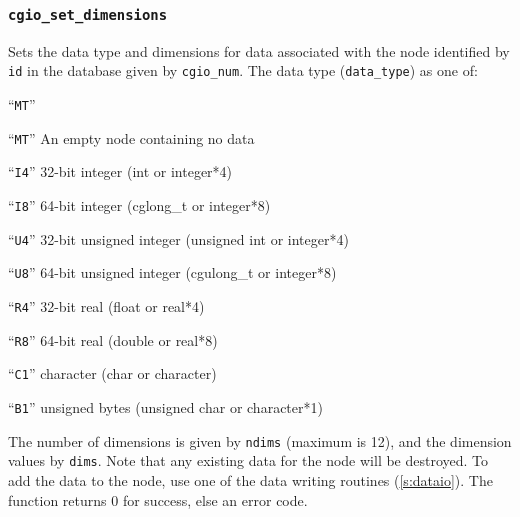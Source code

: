 \subsubsection{\texttt{cgio\_set\_dimensions}} \label{set_dimensions}
    \noindent
    Sets the data type and dimensions for data associated with the node
    identified by \texttt{id} in the database given by \texttt{cgio\_num}.
    The data type (\texttt{data\_type}) as one of:
    \begin{Ventryi}{``\texttt{MT}''}
    \item [``\texttt{MT}'']
          An empty node containing no data
    \item [``\texttt{I4}'']
          32-bit integer (int or integer*4)
    \item [``\texttt{I8}'']
          64-bit integer (cglong\_t or integer*8)
    \item [``\texttt{U4}'']
          32-bit unsigned integer (unsigned int or integer*4)
    \item [``\texttt{U8}'']
          64-bit unsigned integer (cgulong\_t or integer*8)
    \item [``\texttt{R4}'']
          32-bit real (float or real*4)
    \item [``\texttt{R8}'']
          64-bit real (double or real*8)
    \item [``\texttt{C1}'']
          character (char or character)
    \item [``\texttt{B1}'']
          unsigned bytes (unsigned char or character*1)
    \end{Ventryi}
    \noindent
    The number of dimensions is given by \texttt{ndims} (maximum is 12), and
    the dimension values by \texttt{dims}. Note that any existing data for the
    node will be destroyed. To add the data to the node, use one of the
    data writing routines (\autoref{s:dataio}). The function returns 0 for
    success, else an error code.

